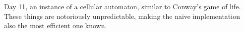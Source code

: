 Day 11, an instance of a cellular automaton, similar to Conway's game of life. These things are notoriously unpredictable, making the naive implementation also the most efficient one known.